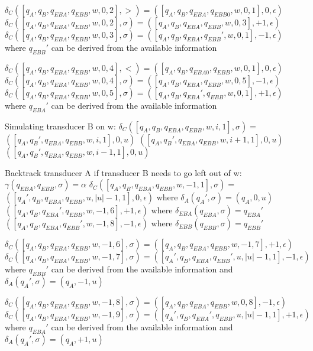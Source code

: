 \documentclass[12pt, a4paper]{article}
\begin{document}
\begin{algorithmic}
    \STATE $\delta_C([q_A, q_B, q_{EBA}, q_{EBB}, w, 0, 2], >) = ([q_A, q_B, q_{EBA}, q_{EBB0}, w, 0, 1], 0, \epsilon)$
    \STATE $\delta_C([q_A, q_B, q_{EBA}, q_{EBB}, w, 0, 2], \sigma) = ([q_A, q_B, q_{EBA}, q_{EBB}, w, 0, 3], +1, \epsilon)$
    \STATE $\delta_C([q_A, q_B, q_{EBA}, q_{EBB}, w, 0, 3], \sigma) = ([q_A, q_B, q_{EBA}, q_{EBB}', w, 0, 1], -1, \epsilon)$ where $q_{EBB}'$ can be derived from the available information

    \STATE $\delta_C([q_A, q_B, q_{EBA}, q_{EBB}, w, 0, 4], <) = ([q_A, q_B, q_{EBA0}, q_{EBB}, w, 0, 1], 0, \epsilon)$
    \STATE $\delta_C([q_A, q_B, q_{EBA}, q_{EBB}, w, 0, 4], \sigma) = ([q_A, q_B, q_{EBA}, q_{EBB}, w, 0, 5], -1, \epsilon)$
    \STATE $\delta_C([q_A, q_B, q_{EBA}, q_{EBB}, w, 0, 5], \sigma) = ([q_A, q_B, q_{EBA}', q_{EBB}, w, 0, 1], +1, \epsilon)$ where $q_{EBA}'$ can be derived from the available information


    \STATE Simulating transducer B on w:
    \STATE $\delta_C([q_A, q_B, q_{EBA}, q_{EBB}, w, i, 1], \sigma) = $
            \STATE $([q_A, q_B', q_{EBA}, q_{EBB}, w, i, 1], 0, u)$ 
            \STATE $([q_A, q_B', q_{EBA}, q_{EBB}, w, i+1, 1], 0, u)$ 
            \STATE $([q_A, q_B', q_{EBA}, q_{EBB}, w, i-1, 1], 0, u)$ 
        \ENDIF

    \STATE Backtrack transducer A if transducer B needs to go left out of w:
    \STATE $\gamma(q_{EBA}, q_{EBB}, \sigma) = \alpha$
    \STATE $\delta_C([q_A, q_B, q_{EBA}, q_{EBB}, w, -1, 1], \sigma) = $\\
        \STATE $([q_A', q_B, q_{EBA}, q_{EBB}, u, |u| - 1, 1], 0, \epsilon)$ where $\delta_A(q_A', \sigma) = (q_A, 0, u)$
        \STATE $([q_A, q_B, q_{EBA}', q_{EBB}, w, -1, 6], +1, \epsilon)$ where $\delta_{EBA}(q_{EBA}, \sigma) = q_{EBA}'$
        \STATE $([q_A, q_B, q_{EBA}, q_{EBB}', w, -1, 8], -1, \epsilon)$ where $\delta_{EBB}(q_{EBB}, \sigma) = q_{EBB}'$
    \ENDIF

    \STATE $\delta_C([q_A, q_B, q_{EBA}, q_{EBB}, w, -1, 6], \sigma) = ([q_A, q_B, q_{EBA}, q_{EBB}, w, -1, 7], +1, \epsilon)$
    \STATE $\delta_C([q_A, q_B, q_{EBA}, q_{EBB}, w, -1, 7], \sigma) = ([q_A', q_B, q_{EBA}, q_{EBB}', u, |u|-1, 1], -1, \epsilon)$ where $q_{EBB}'$ can be derived from the available information and $\delta_A(q_A', \sigma) = (q_A, -1, u)$

    \STATE $\delta_C([q_A, q_B, q_{EBA}, q_{EBB}, w, -1, 8], \sigma) = ([q_A, q_B, q_{EBA}, q_{EBB}, w, 0, 8], -1, \epsilon)$
    \STATE $\delta_C([q_A, q_B, q_{EBA}, q_{EBB}, w, -1, 9], \sigma) = ([q_A', q_B, q_{EBA}', q_{EBB}, u, |u|-1, 1], +1, \epsilon)$ where $q_{EBA}'$ can be derived from the available information and $\delta_A(q_A', \sigma) = (q_A, +1, u)$


\end{algorithmic}
\pagebreak
\end{document}
